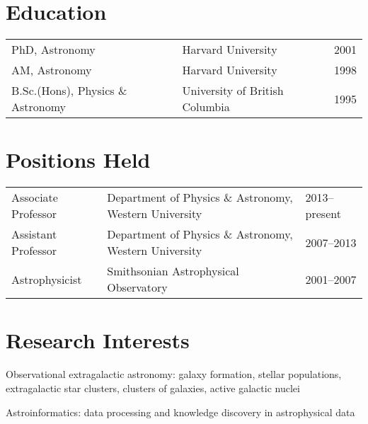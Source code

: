 \documentclass[12pt]{article}
\begin{document}
\maketitle

\section{Education}
\begin{tabular}{lll}
PhD, Astronomy & Harvard University & 2001\\
AM, Astronomy & Harvard University & 1998\\
B.Sc.(Hons),  Physics \& Astronomy & University of British Columbia&1995\\
\end{tabular}

\section{Positions Held} 

\begin{tabular}{lll}
Associate Professor & Department of Physics \& Astronomy, Western University & 2013--present \\
Assistant Professor& Department of Physics \& Astronomy, Western University&2007--2013  \\
 Astrophysicist & Smithsonian Astrophysical Observatory & 2001--2007\\
\end{tabular}


\section{Research Interests}

Observational extragalactic astronomy: galaxy formation, stellar populations, 
extragalactic star clusters, clusters of galaxies, active galactic nuclei


Astroinformatics: data processing and knowledge discovery in astrophysical data
\end{document}
